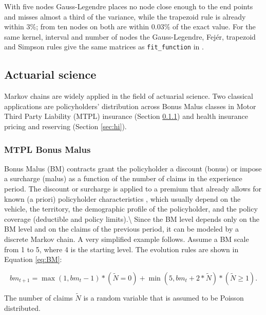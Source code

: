 \documentclass[
  nojss]{jss}
\begin{document}
With five nodes Gauss-Legendre places no node close enough to the end
points and misses almost a third of the variance, while the trapezoid rule is
already within 3\%; from ten nodes on both are within \(0.03\%\) of the
exact value. For the same kernel, interval and number of nodes the
Gauss-Legendre, Fejér, trapezoid and Simpson rules give the same matrices
as \texttt{fit\_function} in .

\subsection{Actuarial science}\label{app:act}

Markov chains are widely applied in the field of actuarial science. Two
classical applications are policyholders' distribution across Bonus Malus
classes in Motor Third Party Liability (MTPL) insurance (Section \ref{sec:bm}) and health insurance pricing and reserving
(Section \ref{sec:hi}).

\subsubsection{MTPL Bonus Malus}\label{sec:bm}

Bonus Malus (BM) contracts grant the policyholder a discount (bonus) or impose a surcharge (malus) as a function of the number of claims in the experience period. The discount or surcharge is applied to a premium that already allows for known (a priori) policyholder characteristics \citep{denuit2007actuarial}, which usually depend on the vehicle, the territory, the demographic profile of the policyholder, and the policy coverage (deductible and policy limits).\textbackslash{}
Since the BM level depends only on the BM level and on the claims of the previous period, it can be modeled by a discrete Markov chain. A very simplified example follows. Assume a BM scale from 1 to 5, where 4 is the starting level. The evolution rules are shown in Equation \ref{eq:BM}:

\begin{equation}
bm_{t + 1} = \max \left( {1,bm_{t} - 1} \right)*\left( {\tilde N = 0} \right) + \min \left( {5,bm_{t} + 2*\tilde N} \right)*\left( {\tilde N \ge 1} \right).
\label{eq:BM}
\end{equation}

The number of claims \(\tilde N\) is a random variable that is assumed
to be Poisson distributed.
\end{document}
